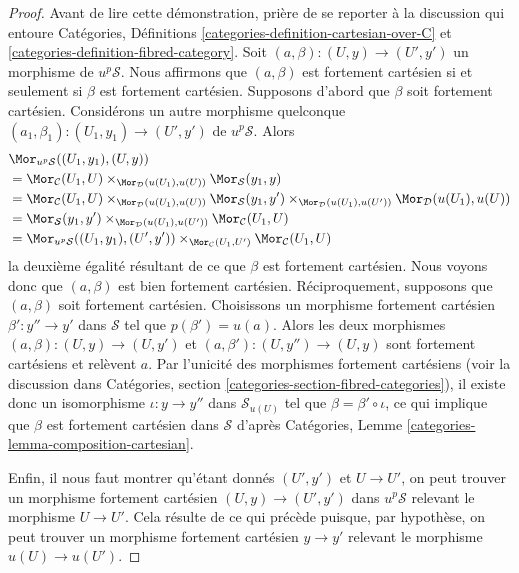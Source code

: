 \begin{proof}
Avant de lire cette démonstration, prière de se reporter à la discussion qui entoure
Catégories, Définitions \ref{categories-definition-cartesian-over-C} et
\ref{categories-definition-fibred-category}.
Soit $(a, \beta) : (U, y) \to (U', y')$ un morphisme de $u^p\mathcal{S}$.
Nous affirmons que $(a, \beta)$ est fortement cartésien si et seulement si
$\beta$ est fortement cartésien. Supposons d'abord que $\beta$ soit fortement cartésien.
Considérons un autre morphisme quelconque
$(a_1, \beta_1) : (U_1, y_1) \to (U', y')$ de $u^p\mathcal{S}$. Alors
\begin{align*}
& \Mor_{u^p\mathcal{S}}((U_1, y_1), (U, y)) \\
& =
\Mor_\mathcal{C}(U_1, U)
\times_{\Mor_\mathcal{D}(u(U_1), u(U))}
\Mor_\mathcal{S}(y_1, y) \\
& =
\Mor_\mathcal{C}(U_1, U)
\times_{\Mor_\mathcal{D}(u(U_1), u(U))}
\Mor_\mathcal{S}(y_1, y')
\times_{\Mor_\mathcal{D}(u(U_1), u(U'))}
\Mor_\mathcal{D}(u(U_1), u(U)) \\
& =
\Mor_\mathcal{S}(y_1, y')
\times_{\Mor_\mathcal{D}(u(U_1), u(U'))}
\Mor_\mathcal{C}(U_1, U) \\
& =
\Mor_{u^p\mathcal{S}}((U_1, y_1), (U', y'))
\times_{\Mor_\mathcal{C}(U_1, U')}
\Mor_\mathcal{C}(U_1, U)
\end{align*}
la deuxième égalité résultant de ce que $\beta$ est fortement cartésien. Nous voyons donc
que $(a, \beta)$ est bien fortement cartésien. Réciproquement, supposons que
$(a, \beta)$ soit fortement cartésien. Choisissons un morphisme fortement cartésien
$\beta' : y'' \to y'$ dans $\mathcal{S}$ tel que $p(\beta') = u(a)$.
Alors les deux morphismes $(a, \beta) : (U, y) \to (U, y')$ et
$(a, \beta') : (U, y'') \to (U, y)$ sont fortement cartésiens et
relèvent $a$. Par l'unicité des morphismes fortement cartésiens
(voir la discussion dans
Catégories, section \ref{categories-section-fibred-categories}),
il existe donc un isomorphisme $\iota : y \to y''$ dans $\mathcal{S}_{u(U)}$
tel que $\beta = \beta' \circ \iota$, ce qui implique que
$\beta$ est fortement cartésien dans $\mathcal{S}$ d'après
Catégories, Lemme \ref{categories-lemma-composition-cartesian}.

\medskip\noindent
Enfin, il nous faut montrer
qu'étant donnés $(U', y')$ et $U \to U'$, on peut trouver un morphisme
fortement cartésien $(U, y) \to (U', y')$ dans $u^p\mathcal{S}$
relevant le morphisme $U \to U'$. Cela résulte de ce qui précède puisque, par hypothèse,
on peut trouver un morphisme fortement cartésien $y \to y'$ relevant le
morphisme $u(U) \to u(U')$.
\end{proof}

